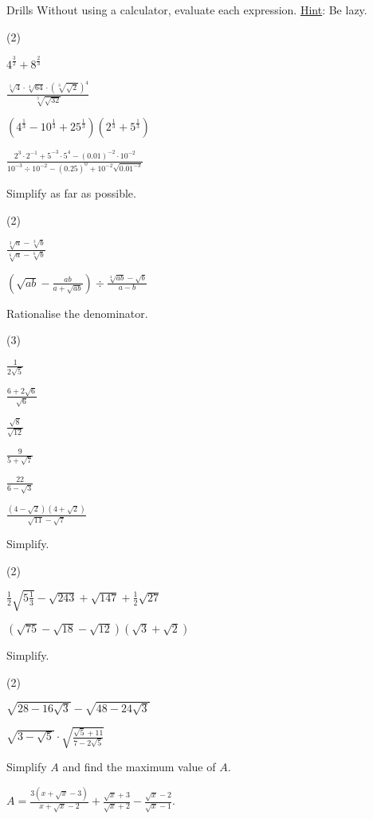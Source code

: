 \documentclass[../../main.tex]{subfiles}
\begin{document}
\begin{questions}{Drills}
Without using a calculator, evaluate each expression.
\underline{Hint}: Be lazy. %
\begin{question_set}(2)
    \item $4^{\frac{3}{2}}+8^{\frac{2}{3}}$
    \item $\frac{\sqrt[5]{4} \cdot \sqrt[4]{64} \cdot \left(\sqrt[3]{\sqrt{2}}\right)^{4}}{\sqrt[3]{\sqrt{32}}}$
    \item $\left(4^{\frac{1}{3}}-10^{\frac{1}{3}}+25^{\frac{1}{3}}\right)\left(2^{\frac{1}{3}}+5^{\frac{1}{3}}\right)$
    \item $\frac{2^{3} \cdot 2^{-1}+5^{-3} \cdot 5^{4}-(0.01)^{-2} \cdot 10^{-2}}{10^{-3} \div 10^{-2}-(0.25)^{0}+10^{-2}\sqrt{0.01^{-3}}}$
\end{question_set}

Simplify as far as possible.
\begin{question_set}(2)
    \item $\frac{\sqrt[3]{a}-\sqrt[3]{b}}{\sqrt[6]{a}-\sqrt[6]{b}}$
    \item $\left(\sqrt{ab} -\frac{ab}{a+\sqrt{ab}}\right) \div \frac{\sqrt[4]{ab}-\sqrt{b}}{a-b}$
\end{question_set}
Rationalise the denominator.
\begin{question_set}(3)
    \item $\frac{1}{2\sqrt{5}}$
    \item $\frac{6+2\sqrt{6}}{\sqrt{6}}$
    \item $\frac{\sqrt{8}}{\sqrt{12}}$
    \item $\frac{9}{5+\sqrt{7}}$
    \item $\frac{22}{6-\sqrt{3}}$
    \item $\frac{\left(4-\sqrt{2}\right)\left(4+\sqrt{2}\right)}{\sqrt{11}-\sqrt{7}}$
\end{question_set}
Simplify.
\begin{question_set}(2)
    \item $\frac{1}{2}\sqrt{5 \frac{1}{3}}-\sqrt{243}+\sqrt{147}+\frac{1}{2}\sqrt{27}$
    \item $\left(\sqrt{75}-\sqrt{18}-\sqrt{12}\right)\left(\sqrt{3}+\sqrt{2}\right)$
\end{question_set}
Simplify.
\begin{question_set}(2)
    \item $\sqrt{28-16\sqrt{3}}-\sqrt{48-24\sqrt{3}}$
    \item $\sqrt{3-\sqrt{5}} \cdot \sqrt{\frac{\sqrt{5}+11}{7-2\sqrt{5}}}$
\end{question_set}
Simplify $A$ and find the maximum value of $A$.

$A=\frac{3\left(x+\sqrt{x}-3\right)}{x+\sqrt{x}-2}+\frac{\sqrt{x}+3}{\sqrt{x}+2}-\frac{\sqrt{x}-2}{\sqrt{x}-1}$.
\end{questions}
\end{document}
